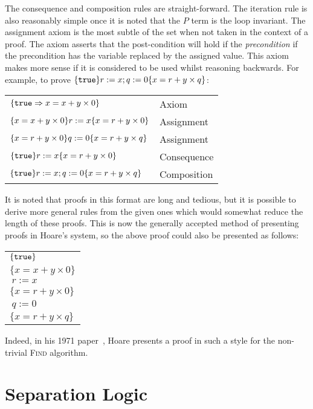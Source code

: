 \documentclass[a4paper,notitlepage]{report}
\begin{document}
  The consequence and composition rules are straight-forward. The iteration rule
  is also reasonably simple once it is noted that the $P$ term is the loop
  invariant. The assignment axiom is the most subtle of the set when not taken
  in the context of a proof. The axiom asserts that the post-condition will hold
  if the \emph{precondition} if the precondition has the variable replaced by
  the assigned value. This axiom makes more sense if it is considered to be used
  whilst reasoning backwards. For example, to prove $\{\texttt{true}\}r := x; q :=
  0\{x = r + y \times q\}$:

  \begin{tabular}{ll}
    $\{\texttt{true} \Rightarrow x = x + y \times 0 \}$ & Axiom \\
    $\{x = x + y \times 0\}r:=x\{x = r + y \times 0\}$ & Assignment \\
    $\{x = r + y \times 0\}q:=0\{x = r + y \times q\}$ & Assignment \\
    $\{\texttt{true}\}r:=x\{x = r + y \times 0\}$ & Consequence \\
    $\{\texttt{true}\}r:=x; q:=0\{x = r + y \times q\}$ & Composition\\
  \end{tabular}

  It is noted that proofs in this format are long and tedious, but it is
  possible to derive more general rules from the given ones which would somewhat
  reduce the length of these proofs. This is now the generally accepted method
  of presenting proofs in Hoare's system, so the above proof could also be
  presented as follows:

  \begin{tabular}{l}
    $\{\texttt{true}\}$ \\
    $\{x = x + y \times 0\}$ \\
    $\ r:=x$ \\
    $\{x = r + y \times 0\}$ \\
    $\ q:=0$ \\
    $\{x = r + y \times q\}$
  \end{tabular}

  Indeed, in his 1971 paper~\cite{Hoare1971proof}, Hoare presents a proof in
  such a style for the non-trivial \textsc{Find} algorithm.


\section{Separation Logic}
\end{document}

